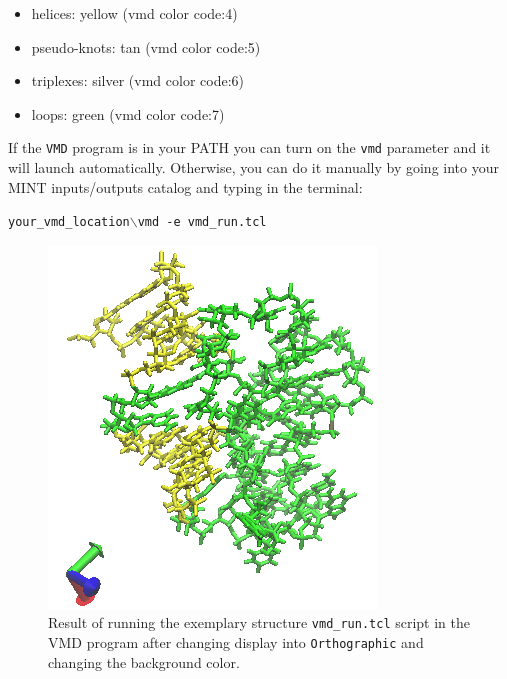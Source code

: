 \documentclass[12pt]{article}
\begin{document}
\begin{itemize}
\item helices: yellow (vmd color code:4)
\item pseudo-knots: tan (vmd color code:5)
\item triplexes: silver (vmd color code:6)
\item loops: green (vmd color code:7)
\end{itemize}

If the \texttt{VMD} program is in your PATH you can turn on the \texttt{vmd} parameter and it will launch automatically. Otherwise, you can do it manually by going into your MINT inputs/outputs catalog and typing in the terminal:

\texttt{your\_vmd\_location$\backslash$vmd -e vmd\_run.tcl }

\begin{figure}[h!]
\centering
\includegraphics[scale=0.8]{./pictures/motifs_vmd.png}
\caption{Result of running the exemplary structure \texttt{vmd\_run.tcl} script in the VMD program after changing display into \texttt{Orthographic} and changing the background color.}
\end{figure}
\end{document}
